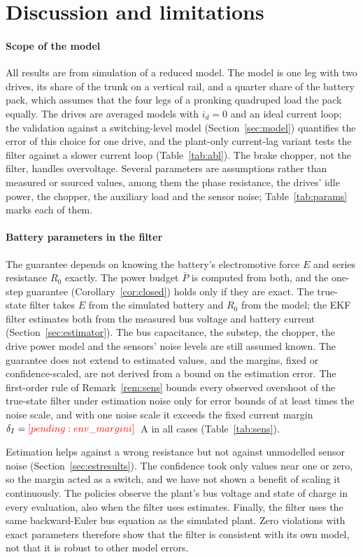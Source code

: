 \section{Discussion and limitations}\label{sec:limits}
\paragraph{Scope of the model}
All results are from simulation of a reduced model. The model is one leg with two drives, its share of the trunk on a vertical rail, and a quarter share of the battery pack, which assumes that the four legs of a pronking quadruped load the pack equally. The drives are averaged models with $i_d=0$ and an ideal current loop; the validation against a switching-level model (Section~\ref{sec:model}) quantifies the error of this choice for one drive, and the plant-only current-lag variant tests the filter against a slower current loop (Table~\ref{tab:abl}). The brake chopper, not the filter, handles overvoltage. Several parameters are assumptions rather than measured or sourced values, among them the phase resistance, the drives' idle power, the chopper, the auxiliary load and the sensor noise; Table~\ref{tab:params} marks each of them.

\paragraph{Battery parameters in the filter}
The guarantee depends on knowing the battery's electromotive force $E$ and series resistance $R_0$ exactly. The power budget $\bar P$ is computed from both, and the one-step guarantee (Corollary~\ref{cor:closed}) holds only if they are exact. The true-state filter takes $E$ from the simulated battery and $R_0$ from the model; the EKF filter estimates both from the measured bus voltage and battery current (Section~\ref{sec:estimator}). The bus capacitance, the substep, the chopper, the drive power model and the sensors' noise levels are still assumed known. The guarantee does not extend to estimated values, and the margins, fixed or confidence-scaled, are not derived from a bound on the estimation error. The first-order rule of Remark~\ref{rem:sens} bounds every observed overshoot of the true-state filter under estimation noise only for error bounds of at least  times the noise scale, and with one noise scale it exceeds the fixed current margin $\delta_I=\res{env_margini}$~A in all  cases (Table~\ref{tab:sens}).

Estimation helps against a wrong resistance but not against unmodelled sensor noise (Section~\ref{sec:estresults}). The confidence took only values near one or zero, so the margin acted as a switch, and we have not shown a benefit of scaling it continuously. The policies observe the plant's bus voltage and state of charge in every evaluation, also when the filter uses estimates. Finally, the filter uses the same backward-Euler bus equation as the simulated plant. Zero violations with exact parameters therefore show that the filter is consistent with its own model, not that it is robust to other model errors.

